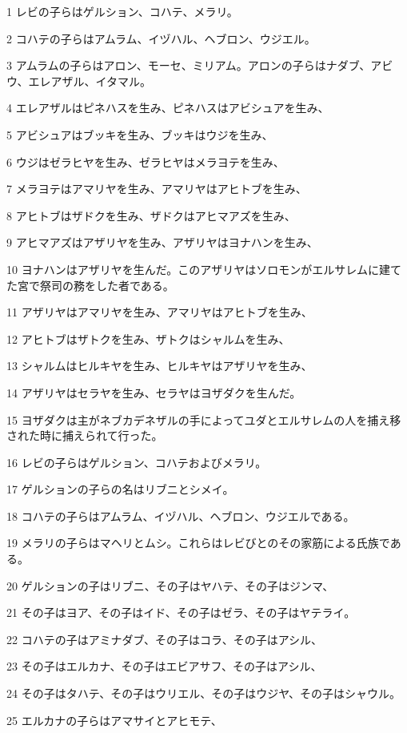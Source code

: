 \par 1 レビの子らはゲルション、コハテ、メラリ。
\par 2 コハテの子らはアムラム、イヅハル、ヘブロン、ウジエル。
\par 3 アムラムの子らはアロン、モーセ、ミリアム。アロンの子らはナダブ、アビウ、エレアザル、イタマル。
\par 4 エレアザルはピネハスを生み、ピネハスはアビシュアを生み、
\par 5 アビシュアはブッキを生み、ブッキはウジを生み、
\par 6 ウジはゼラヒヤを生み、ゼラヒヤはメラヨテを生み、
\par 7 メラヨテはアマリヤを生み、アマリヤはアヒトブを生み、
\par 8 アヒトブはザドクを生み、ザドクはアヒマアズを生み、
\par 9 アヒマアズはアザリヤを生み、アザリヤはヨナハンを生み、
\par 10 ヨナハンはアザリヤを生んだ。このアザリヤはソロモンがエルサレムに建てた宮で祭司の務をした者である。
\par 11 アザリヤはアマリヤを生み、アマリヤはアヒトブを生み、
\par 12 アヒトブはザトクを生み、ザトクはシャルムを生み、
\par 13 シャルムはヒルキヤを生み、ヒルキヤはアザリヤを生み、
\par 14 アザリヤはセラヤを生み、セラヤはヨザダクを生んだ。
\par 15 ヨザダクは主がネブカデネザルの手によってユダとエルサレムの人を捕え移された時に捕えられて行った。
\par 16 レビの子らはゲルション、コハテおよびメラリ。
\par 17 ゲルションの子らの名はリブニとシメイ。
\par 18 コハテの子らはアムラム、イヅハル、ヘブロン、ウジエルである。
\par 19 メラリの子らはマヘリとムシ。これらはレビびとのその家筋による氏族である。
\par 20 ゲルションの子はリブニ、その子はヤハテ、その子はジンマ、
\par 21 その子はヨア、その子はイド、その子はゼラ、その子はヤテライ。
\par 22 コハテの子はアミナダブ、その子はコラ、その子はアシル、
\par 23 その子はエルカナ、その子はエビアサフ、その子はアシル、
\par 24 その子はタハテ、その子はウリエル、その子はウジヤ、その子はシャウル。
\par 25 エルカナの子らはアマサイとアヒモテ、
